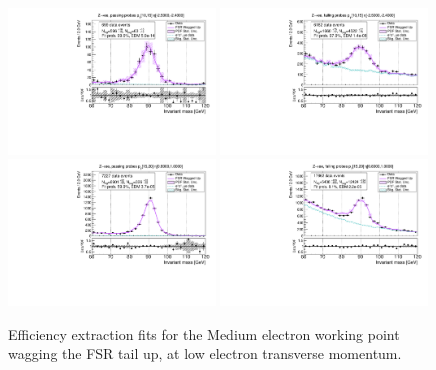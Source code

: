 \begin{figure}
\centering
\includegraphics[width=0.49\textwidth]{figures/Zee_WagFsrUp_BkgLPiEMu_pass_ptBin0_etaBin0.pdf}
\includegraphics[width=0.49\textwidth]{figures/Zee_WagFsrUp_BkgLPiEMu_fail_ptBin0_etaBin0.pdf}
\includegraphics[width=0.49\textwidth]{figures/Zee_WagFsrUp_BkgLPiEMu_pass_ptBin1_etaBin19.pdf}
\includegraphics[width=0.49\textwidth]{figures/Zee_WagFsrUp_BkgLPiEMu_fail_ptBin1_etaBin19.pdf}
\caption{Efficiency extraction fits for the Medium electron working point wagging the FSR tail up, at low electron transverse momentum.}
\label{fig:ZeeAltSigFSRFits1}
\end{figure}

